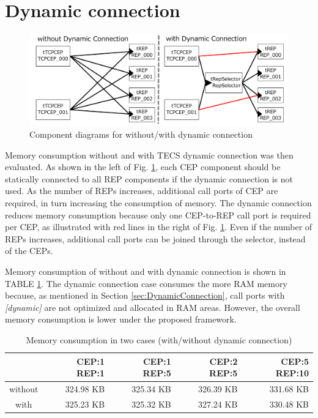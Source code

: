 \documentclass[a4j,12pt,oneside,openany,english]{jsbook}
\begin{document}
\section{Dynamic connection}

\begin{figure}[t]
    \centering
    \includegraphics[width=12cm,clip]{figure/ComparisonOfDynamicConnection.pdf}
    \caption{Component diagrams for without/with dynamic connection}
    \label{fig:ComparisonOfDynamicConnection}
\end{figure}

Memory consumption without and with TECS dynamic connection was then evaluated.
As shown in the left of Fig. \ref{fig:ComparisonOfDynamicConnection}, each CEP component should be statically connected to all REP components if the dynamic connection is not used.
As the number of REPs increases, additional call ports of CEP are required, in turn increasing the consumption of memory. 
The dynamic connection reduces memory consumption because only one CEP-to-REP call port is required per CEP, as illustrated with red lines in the right of Fig. \ref{fig:ComparisonOfDynamicConnection}.
Even if the number of REPs increases, additional call ports can be joined through the selector, instead of the CEPs.

Memory consumption of without and with dynamic connection is shown in TABLE \ref{fig:EvaluationOfDynamicConnection}.
The dynamic connection case consumes the more RAM memory because, as mentioned in Section \ref{sec:DynamicConnection}, call ports with {\it [dynamic]} are not optimized and allocated in RAM areas.
However, the overall memory consumption is lower under the proposed framework.

\begin{table}[t]
    \centering
    \caption{Memory consumption in two cases (with/without dynamic connection)}
    \begin{tabular}{c|r|r|r|r}
        \hline\hline
                &  CEP:1 REP:1 & CEP:1 REP:5 & CEP:2 REP:5 & CEP:5 REP:10 \\ \hline
        without &  324.98 KB   & 325.34 KB   & 326.39 KB   & 331.68 KB   \\
        with    &  325.23 KB   & 325.32 KB   & 327.24 KB   & 330.48 KB   \\
        \hline
    \end{tabular}
    \label{fig:EvaluationOfDynamicConnection}
\end{table}
\end{document}
